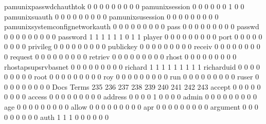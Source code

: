 \documentclass[compress,8pt]{beamer}
\begin{document}
\begin{frame}
\begin{Schunk}
  pamunixpasswdchauthtok                     0   0   0   0   0   0   0   0   0
  pamunixsession                             0   0   0   0   0   0   1   0   0
  pamunixsuauth                              0   0   0   0   0   0   0   0   0
  pamunixsusession                           0   0   0   0   0   0   0   0   0
  pamunixsystemconfignetworkauth             0   0   0   0   0   0   0   0   0
  pass                                       0   0   0   0   0   0   0   0   0
  passwd                                     0   0   0   0   0   0   0   0   0
  password                                   1   1   1   1   1   1   0   1   1
  player                                     0   0   0   0   0   0   0   0   0
  port                                       0   0   0   0   0   0   0   0   0
  privileg                                   0   0   0   0   0   0   0   0   0
  publickey                                  0   0   0   0   0   0   0   0   0
  receiv                                     0   0   0   0   0   0   0   0   0
  request                                    0   0   0   0   0   0   0   0   0
  retriev                                    0   0   0   0   0   0   0   0   0
  rhost                                      0   0   0   0   0   0   0   0   0
  rhostapsupsrvbasnet                        0   0   0   0   0   0   0   0   0
  richard                                    1   1   1   1   1   1   1   1   1
  richarduid                                 0   0   0   0   0   0   0   0   0
  root                                       0   0   0   0   0   0   0   0   0
  roy                                        0   0   0   0   0   0   0   0   0
  run                                        0   0   0   0   0   0   0   0   0
  ruser                                      0   0   0   0   0   0   0   0   0
                                          Docs
Terms                                      235 236 237 238 239 240 241 242 243
  accept                                     0   0   0   0   0   0   0   0   0
  access                                     0   0   0   0   0   0   0   0   0
  address                                    0   0   0   0   1   0   0   0   0
  admin                                      0   0   0   0   0   0   0   0   0
  age                                        0   0   0   0   0   0   0   0   0
  allow                                      0   0   0   0   0   0   0   0   0
  apr                                        0   0   0   0   0   0   0   0   0
  argument                                   0   0   0   0   0   0   0   0   0
  auth                                       1   1   1   0   0   0   0   0   0

\end{Schunk}
\end{frame}
\end{document}
